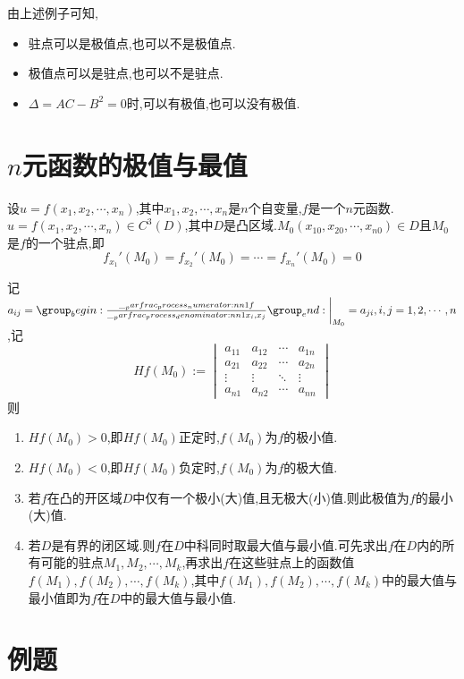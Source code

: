 \begin{remark}
    由上述例子可知,
    \begin{itemize}
        \item 驻点可以是极值点,也可以不是极值点.
        \item 极值点可以是驻点,也可以不是驻点.
        \item $\Delta = AC - B^2 = 0 $时,可以有极值,也可以没有极值.
    \end{itemize}
\end{remark}

\section{$n$元函数的极值与最值}

设$u=f(x_1,x_2,\cdots,x_n)$,其中$x_1,x_2,\cdots,x_n$是$n$个自变量,$f$是一个$n$元函数.
$u=f(x_1,x_2,\cdots,x_n) \in C^3(D)$,其中$D$是凸区域.$M_0(x_{10},x_{20},\cdots,x_{n0}) \in D$且$M_0$是$f$的一个驻点,即
$$
f_{x_1}'(M_0) = f_{x_2}'(M_0) = \cdots = f_{x_n}'(M_0) = 0
$$

记$a_{ij} = \parfrac{f}{x_i,x_j} \bigg|_{M_0} = a_{ji}, i,j = 1,2,\cdots,n$,记$$Hf(M_0) := \begin{vmatrix}
    a_{11} & a_{12} & \cdots & a_{1n}\\
    a_{21} & a_{22} & \cdots & a_{2n}\\
    \vdots & \vdots & \ddots & \vdots\\
    a_{n1} & a_{n2} & \cdots & a_{nn}
\end{vmatrix}$$则
\begin{enumerate}
    \item $Hf(M_0) > 0 $,即$Hf(M_0)$正定时,$f(M_0)$为$f$的极小值.
    \item $Hf(M_0) < 0 $,即$Hf(M_0)$负定时,$f(M_0)$为$f$的极大值.
    \item 若$f$在凸的开区域$D$中仅有一个极小(大)值,且无极大(小)值.则此极值为$f$的最小(大)值.
    \item 若$D$是有界的闭区域.则$f$在$D$中科同时取最大值与最小值.可先求出$f$在$D$内的所有可能的驻点$M_1,M_2,\cdots,M_k$,再求出$f$在这些驻点上的函数值$f(M_1),f(M_2),\cdots,f(M_k)$,其中$f(M_1),f(M_2),\cdots,f(M_k)$中的最大值与最小值即为$f$在$D$中的最大值与最小值.
\end{enumerate}

\section{例题}

